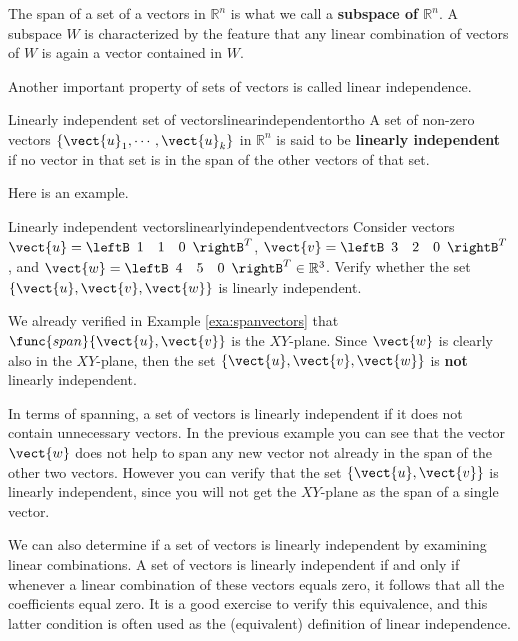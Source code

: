 The span of a set of a vectors in $\mathbb{R}^n$ is what we call a \textbf{subspace of $\mathbb{R}^n$}. A subspace $W$ is characterized by the feature that any linear combination of vectors of $W$ is again a vector contained in $W$. 

Another important property of sets of vectors is called linear independence. 

\begin{definition}{Linearly independent set of vectors}{linearindependentortho}
A set of non-zero vectors $\{ \vect{u}_1, \cdots ,\vect{u}_k\}$ in $\mathbb{R}^{n}$ is said to be 
\textbf{linearly independent}
 if no vector in that set is in the span of the other vectors of that set.
\end{definition}

Here is an example.  

\begin{example}{Linearly independent vectors}{linearlyindependentvectors}
Consider vectors $\vect{u}=\leftB 
\begin{array}{rrr}
1  & 1 & 0
\end{array}
\rightB^T$, 
$\vect{v}=\leftB 
\begin{array}{rrr}
3  & 2 & 0
\end{array}
\rightB^T$, and
$\vect{w}=\leftB 
\begin{array}{rrr}
4  & 5 & 0
\end{array}
\rightB^T  \in \mathbb{R}^{3}$.
Verify whether the set $\{\vect{u}, \vect{v}, \vect{w}\}$ is linearly independent. 
\end{example}

\begin{solution}
We already verified in Example \ref{exa:spanvectors} that
$\func{span} \{\vect{u}, \vect{v} \}$ is the $XY$-plane. Since $\vect{w}$
is clearly also in the $XY$-plane, then the set $\{\vect{u}, \vect{v},
\vect{w}\}$ is \textbf{not} linearly independent.
\end{solution}

In terms of spanning, a set of vectors is linearly independent if it
does not contain unnecessary vectors. In the previous example you
can see that the vector $\vect{w}$ does not help to span any new vector
not already in the span of the other two vectors. However you can
verify that the set $\{\vect{u}, \vect{v}\}$ is linearly independent,
since you will not get the $XY$-plane as the span of a single vector.

We can also determine if a set of vectors is linearly independent by examining linear combinations. A set of vectors is linearly independent if and only if
whenever a linear combination of these vectors equals zero, it follows
that all the coefficients equal zero. It is a good exercise to verify
this equivalence, and this latter condition is often used as the
(equivalent) definition of linear independence.

